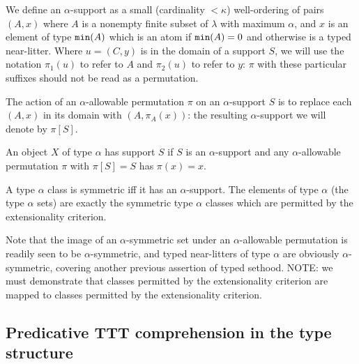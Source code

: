 \documentclass[12pt]{article}
\begin{document}
We define an $\alpha$-support as a small (cardinality $<\kappa$) well-ordering of pairs $(A,x)$ where $A$ is a nonempty finite subset of $\lambda$ with maximum $\alpha$, and $x$ is an element of type ${\tt min}(A)$ which is an atom if ${\tt min}(A)=0$ and otherwise is a typed near-litter.  Where $u = (C,y)$ is in the domain of a support $S$, we will use the notation $\pi_1(u)$ to refer to $A$ and $\pi_2(u)$ to refer to $y$:  $\pi$ with these particular suffixes should not be read as a permutation.

The action of an $\alpha$-allowable permutation $\pi$ on an $\alpha$-support $S$ is to replace each $(A,x)$ in its domain with $(A,\pi_A(x))$:  the resulting $\alpha$-support we will denote by $\pi[S]$.

An object $X$ of type $\alpha$ has support $S$ if $S$ is an $\alpha$-support and any $\alpha$-allowable permutation $\pi$ with $\pi[S]=S$ has $\pi(x)=x$.

A type $\alpha$ class is symmetric iff it has an $\alpha$-support.  The elements of type $\alpha$ (the type $\alpha$ sets) are exactly the symmetric type $\alpha$ classes which are permitted by the extensionality criterion.

Note that the image of an $\alpha$-symmetric set under an $\alpha$-allowable permutation is readily seen to be $\alpha$-symmetric, and typed near-litters of type $\alpha$ are obviously $\alpha$-symmetric, covering another previous assertion of typed sethood.   NOTE:  we must demonstrate that classes permitted by the extensionality criterion are mapped to 
classes permitted by the extensionality criterion.

\subsection{Predicative TTT comprehension in the type structure}
\end{document}
